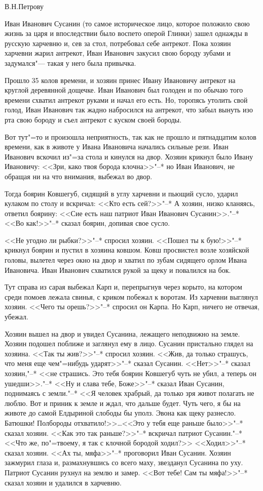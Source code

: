 \begin{flushright}
В.Н.Петрову
\end{flushright}

Иван Иванович Сусанин (то самое историческое лицо, которое положило свою жизнь
за царя и впоследствии было воспето оперой Глинки) зашел однажды в русскую
харчевню и, сев за стол, потребовал себе антрекот. Пока хозяин харчевни жарил
антрекот, Иван Иванович закусил свою бороду зубами и задумался"--- такая у него
была привычка.

Прошло 35 колов времени, и хозяин принес Ивану Ивановичу антрекот на круглой
деревянной дощечке. Иван Иванович был голоден и по обычаю того времени схватил
антрекот руками и начал его есть. Но, торопясь утолить свой голод, Иван Иванович
так жадно набросился на антрекот, что забыл вынуть изо рта свою бороду и съел
антрекот с куском своей бороды.

Вот тут"=то и произошла неприятность, так как не прошло и пятнадцатим колов
времени, как в животе у Ивана Ивановича начались сильные рези. Иван Иванович
вскочил из"=за стола и кинулся на двор. Хозяин крикнул было Ивану Ивановичу:
<<Зри, како твоя борода клочна>>"--* но Иван Иванович, не обращая ни на что
внимания, выбежал во двор.

Тогда боярин Ковшегуб, сидящий в углу харчевни и пьющий сусло, ударил кулаком по
столу и вскричал: <<Кто есть сей?>>"--* А хозяин, низко кланяясь, ответил
боярину: <<Сие есть наш патриот Иван Иванович Сусанин>>."--* <<Во как!>>"--*
сказал боярин, допивая свое сусло.

<<Не угодно ли рыбки?>>"--* спросил хозяин. <<Пошел ты к бую!>>"--* крикнул
боярин и пустил в хозяина ковшом. Ковш просвистел возле хозяйской головы,
вылетел через окно на двор и хватил по зубам сидящего орлом Ивана Ивановича.
Иван Иванович схватился рукой за щеку и повалился на бок.

Тут справа из сарая выбежал Карп и, перепрыгнув через корыто, на котором среди
помоев лежала свинья, с криком побежал к воротам. Из харчевни выглянул хозяин.
<<Чего ты орешь?>>"--* спросил он Карпа. Но Карп, ничего не отвечая, убежал.

Хозяин вышел на двор и увидел Сусанина, лежащего неподвижно на земле. Хозяин
подошел поближе и заглянул ему в лицо. Сусанин пристально глядел на хозяина.
<<Так ты жив?>>"--* спросил хозяин. <<Жив, да только страшусь, что меня еще
чем"=нибудь ударят>>"--* сказал Сусанин. <<Нет>>"--* сказал хозяин,"--* <<не
страшись. Это тебя боярин Ковшегуб чуть не убил, а теперь он ушедши>>."--* <<Ну и
слава тебе, Боже>>"--* сказал Иван Сусанин, поднимаясь с земли."--* <<Я человек
храбрый, да только зря живот полагать не люблю. Вот и приник к земле и ждал, что
дальше будет. Чуть чего, я бы на животе до самой Елдыриной слободы бы уполз.
Эвона как щеку разнесло. Батюшки! Полбороды отхватило!>>\dots <<Это у тебя еще
раньше было>>"--* сказал хозяин. <<Как это так раньше?>>"--* вскричал патриот
Сусанин."--* <<Что же, по"=твоему, я так с клочной бородой ходил?>> <<Ходил>>"--*
сказал хозяин. <<Ах ты, мяфа>>"--* проговорил Иван Сусанин. Хозяин зажмурил
глаза и, размахнувшись со всего маху, звезданул Сусанина по уху. Патриот Сусанин
рухнул на землю и замер. <<Вот тебе! Сам ты мяфа!>>"--* сказал хозяин и удалился
в харчевню.

